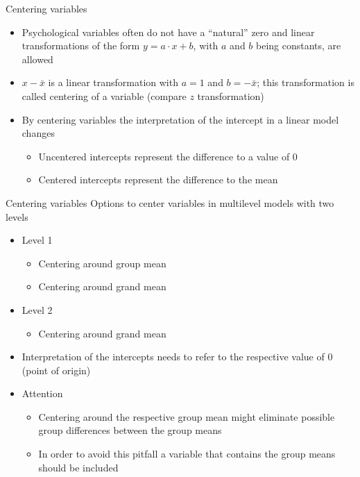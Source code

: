 \documentclass{beamer}
\begin{document}
\begin{frame}[fragile]{Centering variables}
  \begin{itemize}
    \item Psychological variables often do not have a ``natural'' zero and
      linear transformations of the form $y = a\cdot x + b$, with $a$ and
      $b$ being constants, are allowed
    \item $x - \bar x$ is a linear transformation with $a = 1$ and $b =
      -\bar x$; this transformation is called centering of a variable
      (compare $z$ transformation)
    \item By centering variables the interpretation of the intercept in a
      linear model changes
    \begin{itemize}
      \item Uncentered intercepts represent the difference to a value of 0
      \item Centered intercepts represent the difference to the mean
    \end{itemize}
  \end{itemize}
\end{frame}

\begin{frame}{Centering variables}
  Options to center variables in multilevel models with two levels
  \begin{itemize}
    \item Level 1
      \begin{itemize}
        \item Centering around group mean
        \item Centering around grand mean
      \end{itemize}
    \item Level 2
      \begin{itemize}
        \item Centering around grand mean
      \end{itemize}
    \item Interpretation of the intercepts needs to refer to the respective
      value of 0 (point of origin)
    \item Attention
      \begin{itemize}
        \item Centering around the respective group mean might eliminate
          possible group differences between the group means
        \item In order to avoid this pitfall a variable that contains the
          group means should be included
      \end{itemize}
  \end{itemize}
\end{frame}
\end{document}
